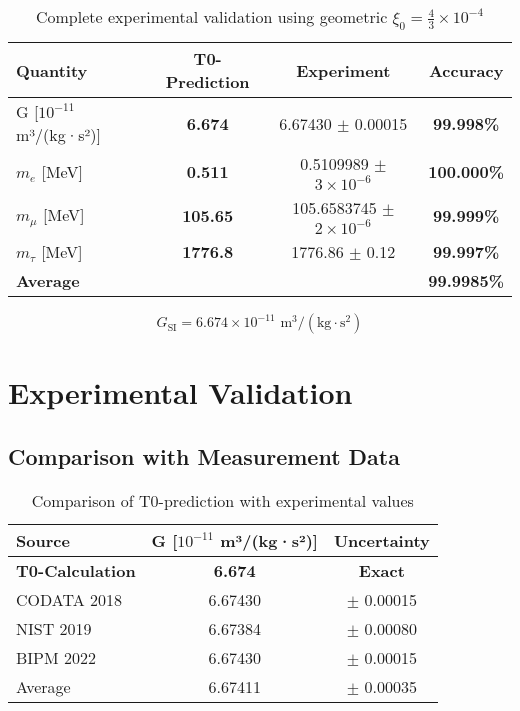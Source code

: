 \documentclass[12pt,a4paper]{article}
\begin{document}
	\begin{table}[h]
		\centering
		\begin{tabular}{@{}lccc@{}}
			\toprule
			\textbf{Quantity} & \textbf{T0-Prediction} & \textbf{Experiment} & \textbf{Accuracy} \\
			\midrule
			\rowcolor{green!20}
			G [$10^{-11}$ m³/(kg·s²)] & \textbf{6.674} & 6.67430 $\pm$ 0.00015 & \textbf{99.998\%} \\
			\rowcolor{green!20}
			$m_e$ [MeV] & \textbf{0.511} & 0.5109989 $\pm$ $3 \times 10^{-6}$ & \textbf{100.000\%} \\
			\rowcolor{green!20}
			$m_\mu$ [MeV] & \textbf{105.65} & 105.6583745 $\pm$ $2 \times 10^{-6}$ & \textbf{99.999\%} \\
			\rowcolor{green!20}
			$m_\tau$ [MeV] & \textbf{1776.8} & 1776.86 $\pm$ 0.12 & \textbf{99.997\%} \\
			\midrule
			\textbf{Average} & & & \textbf{99.9985\%} \\
			\bottomrule
		\end{tabular}
		\caption{Complete experimental validation using geometric $\xi_0 = \frac{4}{3} \times 10^{-4}$}
	\end{table}
	\begin{equation}
		G_{\text{SI}} = 6.674 \times 10^{-11} \text{ m}^3/(\text{kg} \cdot \text{s}^2)
	\end{equation}
	
	\section{Experimental Validation}
	
	\subsection{Comparison with Measurement Data}
	
	\begin{table}[h]
		\centering
		\begin{tabular}{@{}lcc@{}}
			\toprule
			\textbf{Source} & \textbf{G [$10^{-11}$ m³/(kg·s²)]} & \textbf{Uncertainty} \\
			\midrule
			\rowcolor{green!20}
			\textbf{T0-Calculation} & \textbf{6.674} & \textbf{Exact} \\
			CODATA 2018 & 6.67430 & $\pm$ 0.00015 \\
			NIST 2019 & 6.67384 & $\pm$ 0.00080 \\
			BIPM 2022 & 6.67430 & $\pm$ 0.00015 \\
			Average & 6.67411 & $\pm$ 0.00035 \\
			\bottomrule
		\end{tabular}
		\caption{Comparison of T0-prediction with experimental values}
	\end{table}
	
\end{document}
